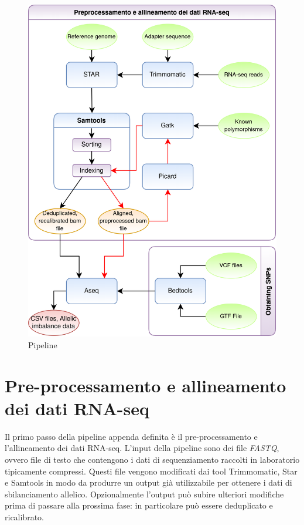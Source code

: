   \begin{figure}[H]
    \label{fig:proj_pipeline}
    \centering
    \includegraphics[scale=0.2]{pipeline.png}
    \caption{Pipeline}
  \end{figure}

  \section{Pre-processamento e allineamento dei dati RNA-seq}
  \label{sec:pre_all_rna_seq}
  Il primo passo della pipeline appenda definita \`e il pre-processamento e l'allineamento dei dati RNA-seq.
  L'input della pipeline sono dei file \emph{FASTQ}, ovvero file di testo che contengono i dati di sequenziamento raccolti in laboratorio tipicamente compressi.
  Questi file vengono modificati dai tool Trimmomatic, Star e Samtools in modo da produrre un output gi\`a utilizzabile per ottenere i dati di sbilanciamento allelico.
  Opzionalmente l'output pu\`o subire ulteriori modifiche prima di passare alla prossima fase: in particolare pu\`o essere deduplicato e ricalibrato.
	
